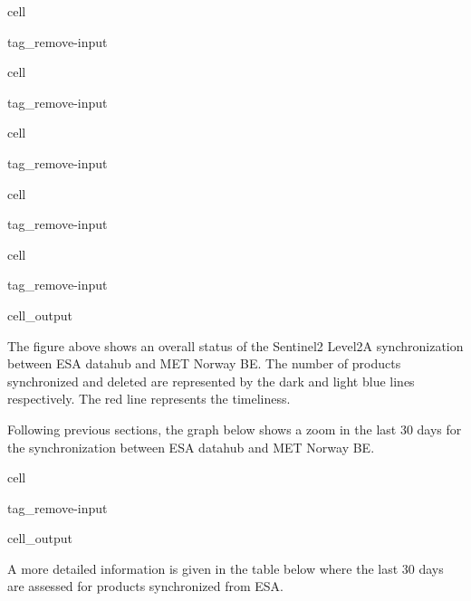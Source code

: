 \documentclass[letterpaper,10pt,english]{jupyterBook}
\begin{document}
\begin{sphinxuseclass}{cell}
\begin{sphinxuseclass}{tag_remove-input}
\end{sphinxuseclass}
\end{sphinxuseclass}
\begin{sphinxuseclass}{cell}
\begin{sphinxuseclass}{tag_remove-input}
\end{sphinxuseclass}
\end{sphinxuseclass}
\begin{sphinxuseclass}{cell}
\begin{sphinxuseclass}{tag_remove-input}
\end{sphinxuseclass}
\end{sphinxuseclass}
\begin{sphinxuseclass}{cell}
\begin{sphinxuseclass}{tag_remove-input}
\end{sphinxuseclass}
\end{sphinxuseclass}
\begin{sphinxuseclass}{cell}
\begin{sphinxuseclass}{tag_remove-input}\begin{sphinxVerbatimOutput}

\begin{sphinxuseclass}{cell_output}
\noindent{}

\end{sphinxuseclass}\end{sphinxVerbatimOutput}

\end{sphinxuseclass}
\end{sphinxuseclass}
\sphinxAtStartPar
The figure above shows an overall status of the Sentinel\sphinxhyphen{}2 Level\sphinxhyphen{}2A synchronization between ESA datahub and MET Norway BE. The number of products synchronized and deleted are represented by the dark and light blue lines respectively. The red line represents the timeliness.

\sphinxAtStartPar
Following previous sections, the graph below shows a zoom in the last 30 days for the synchronization between ESA datahub and MET Norway BE.

\begin{sphinxuseclass}{cell}
\begin{sphinxuseclass}{tag_remove-input}\begin{sphinxVerbatimOutput}

\begin{sphinxuseclass}{cell_output}
\noindent{}

\end{sphinxuseclass}\end{sphinxVerbatimOutput}

\end{sphinxuseclass}
\end{sphinxuseclass}
\sphinxAtStartPar
A more detailed information is given in the table below where the last 30 days are assessed for products synchronized from ESA.
\end{document}
